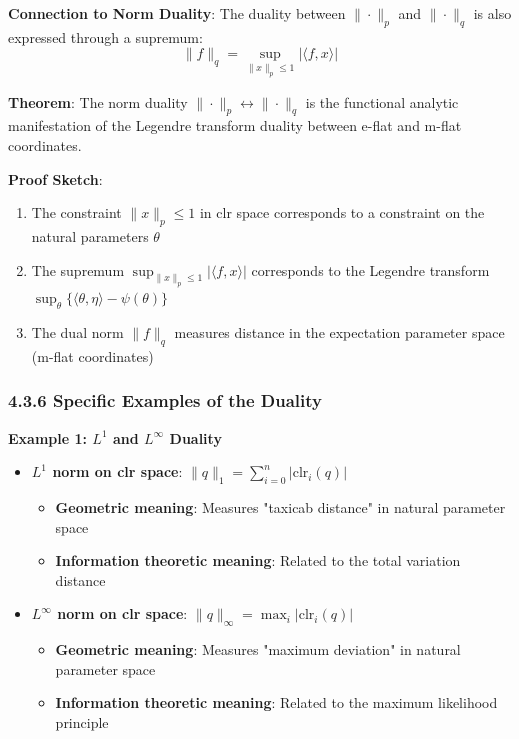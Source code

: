 \documentclass{amsart}
\theoremstyle{plain}
\theoremstyle{definition}
\theoremstyle{remark}
\begin{document}
\textbf{Connection to Norm Duality}:
The duality between $\|\cdot\|_p$ and $\|\cdot\|_q$ is also expressed through a supremum:
\[
\|f\|_q = \sup_{\|x\|_p \leq 1} |\langle f, x \rangle|
\]

\textbf{Theorem}: The norm duality $\|\cdot\|_p \leftrightarrow \|\cdot\|_q$ is the functional analytic manifestation of the Legendre transform duality between e-flat and m-flat coordinates.

\textbf{Proof Sketch}:

\begin{enumerate}
	\item The constraint $\|x\|_p \leq 1$ in clr space corresponds to a constraint on the natural parameters $\theta$
	\item The supremum $\sup_{\|x\|_p \leq 1} |\langle f, x \rangle|$ corresponds to the Legendre transform $\sup_\theta \{\langle \theta, \eta \rangle - \psi(\theta)\}$
	\item The dual norm $\|f\|_q$ measures distance in the expectation parameter space (m-flat coordinates)
\end{enumerate}

\subsubsection{4.3.6 Specific Examples of the Duality}

\textbf{Example 1: $L^1$ and $L^\infty$ Duality}

\begin{itemize}
	\item \textbf{$L^1$ norm on clr space}: $\|q\|_1 = \sum_{i=0}^n |\text{clr}_i(q)|$
	\begin{itemize}
		\item \textbf{Geometric meaning}: Measures "taxicab distance" in natural parameter space
		\item \textbf{Information theoretic meaning}: Related to the total variation distance
	\end{itemize}
	\item \textbf{$L^\infty$ norm on clr space}: $\|q\|_\infty = \max_i |\text{clr}_i(q)|$
	\begin{itemize}
		\item \textbf{Geometric meaning}: Measures "maximum deviation" in natural parameter space
		\item \textbf{Information theoretic meaning}: Related to the maximum likelihood principle
	\end{itemize}
\end{itemize}
\end{document}
